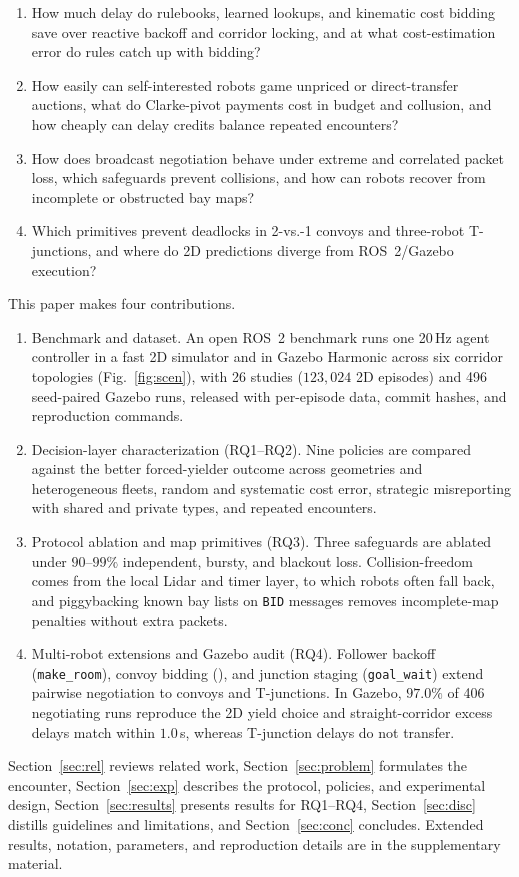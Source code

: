 \begin{enumerate}
\item[RQ1] How much delay do rulebooks, learned lookups, and kinematic cost bidding save over reactive backoff and corridor locking, and at what cost-estimation error do rules catch up with bidding?
\item[RQ2] How easily can self-interested robots game unpriced or direct-transfer auctions, what do Clarke-pivot payments cost in budget and collusion, and how cheaply can delay credits balance repeated encounters?
\item[RQ3] How does broadcast negotiation behave under extreme and correlated packet loss, which safeguards prevent collisions, and how can robots recover from incomplete or obstructed bay maps?
\item[RQ4] Which primitives prevent deadlocks in 2-vs.-1 convoys and three-robot T-junctions, and where do 2D predictions diverge from ROS~2/Gazebo execution?
\end{enumerate}

This paper makes four contributions.
\begin{enumerate}
\item Benchmark and dataset. An open ROS~2 benchmark runs one 20\,Hz agent controller in a fast 2D simulator and in Gazebo Harmonic across six corridor topologies (Fig.~\ref{fig:scen}), with 26 studies ($123{,}024$ 2D episodes) and 496 seed-paired Gazebo runs, released with per-episode data, commit hashes, and reproduction commands.
\item Decision-layer characterization (RQ1--RQ2). Nine policies are compared against the better forced-yielder outcome across geometries and heterogeneous fleets, random and systematic cost error, strategic misreporting with shared and private types, and repeated encounters.
\item Protocol ablation and map primitives (RQ3). Three safeguards are ablated under $90$--$99\%$ independent, bursty, and blackout loss. Collision-freedom comes from the local Lidar and timer layer, to which robots often fall back, and piggybacking known bay lists on \texttt{BID} messages removes incomplete-map penalties without extra packets.
\item Multi-robot extensions and Gazebo audit (RQ4). Follower backoff (\texttt{make\_room}), convoy bidding (\gb), and junction staging (\texttt{goal\_wait}) extend pairwise negotiation to convoys and T-junctions. In Gazebo, $97.0\%$ of 406 negotiating runs reproduce the 2D yield choice and straight-corridor excess delays match within $1.0$\,s, whereas T-junction delays do not transfer.
\end{enumerate}

Section~\ref{sec:rel} reviews related work, Section~\ref{sec:problem} formulates the encounter, Section~\ref{sec:exp} describes the protocol, policies, and experimental design, Section~\ref{sec:results} presents results for RQ1--RQ4, Section~\ref{sec:disc} distills guidelines and limitations, and Section~\ref{sec:conc} concludes. Extended results, notation, parameters, and reproduction details are in the supplementary material.